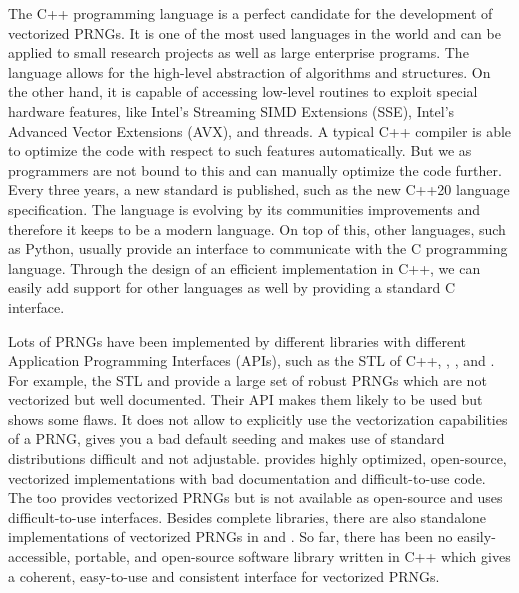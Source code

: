 \documentclass{stdlocal}
\begin{document}
The C++ programming language is a perfect candidate for the development of vectorized PRNGs.
It is one of the most used languages in the world and can be applied to small research projects as well as large enterprise programs.
The language allows for the high-level abstraction of algorithms and structures.
On the other hand, it is capable of accessing low-level routines to exploit special hardware features, like Intel's Streaming SIMD Extensions (SSE), Intel's Advanced Vector Extensions (AVX), and threads.
A typical C++ compiler is able to optimize the code with respect to such features automatically.
But we as programmers are not bound to this and can manually optimize the code further.
Every three years, a new standard is published, such as the new C++20 language specification.
The language is evolving by its communities improvements and therefore it keeps to be a modern language.
On top of this, other languages, such as Python, usually provide an interface to communicate with the C programming language.
Through the design of an efficient implementation in C++, we can easily add support for other languages as well by providing a standard C interface.
\autocite{stroustrup2014,meyers2014,vandevoorde2018,intel-intrinsics-guide,reddy2011,cppreference,isocpp}

Lots of PRNGs have been implemented by different libraries with different Application Programming Interfaces (APIs), such as the STL of C++, , , and .
For example, the STL and  provide a large set of robust PRNGs which are not vectorized but well documented.
Their API makes them likely to be used but shows some flaws.
It does not allow to explicitly use the vectorization capabilities of a PRNG, gives you a bad default seeding and makes use of standard distributions difficult and not adjustable.
 provides highly optimized, open-source, vectorized implementations with bad documentation and difficult-to-use code.
The  too provides vectorized PRNGs but is not available as open-source and uses difficult-to-use interfaces.
Besides complete libraries, there are also standalone implementations of vectorized PRNGs in \textcite{lemire-pcg} and \textcite{lemire-xorshift}.
So far, there has been no easily-accessible, portable, and open-source software library written in C++ which gives a coherent, easy-to-use and consistent interface for vectorized PRNGs.
\autocite{intel-mkl,boost,guskova2016,oneill-blog-api,gcc-libstdcpp}
\end{document}
